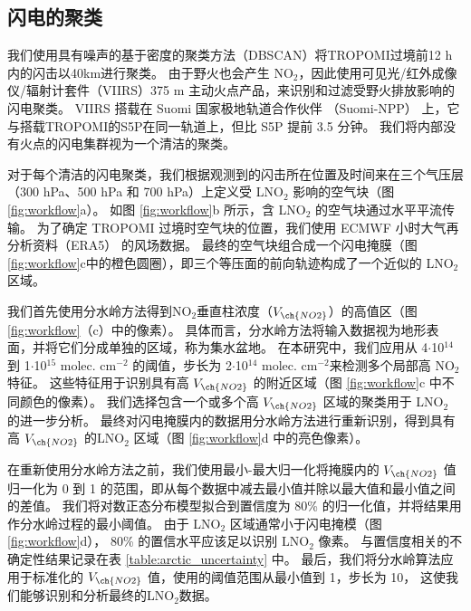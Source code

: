\subsection*{闪电的聚类}

我们使用具有噪声的基于密度的聚类方法（DBSCAN）将TROPOMI过境前12 h内\citep{Allen.2021a}的闪击以40km进行聚类\citep{backlund2011density,Schubert.2017}。
由于野火也会产生 NO$_2$，因此使用可见光/红外成像仪/辐射计套件（VIIRS）375 m 主动火点产品，来识别和过滤受野火排放影响的闪电聚类。
VIIRS 搭载在 Suomi 国家极地轨道合作伙伴 （Suomi-NPP） 上，它与搭载TROPOMI的S5P在同一轨道上，但比 S5P 提前 3.5 分钟。
我们将内部没有火点的闪电集群视为一个清洁的聚类。

对于每个清洁的闪电聚类，我们根据观测到的闪击所在位置及时间来在三个气压层（300 hPa、500 hPa 和 700 hPa）上定义受 LNO$_2$ 影响的空气块（图 \ref{fig:workflow}a）。
如图 \ref{fig:workflow}b 所示，含 LNO$_2$ 的空气块通过水平平流传输。
为了确定 TROPOMI 过境时空气块的位置，我们使用 ECMWF 小时大气再分析资料（ERA5） 的风场数据\citep{Hersbach.2020}。
最终的空气块组合成一个闪电掩膜（图 \ref{fig:workflow}c中的橙色圆圈），即三个等压面的前向轨迹构成了一个近似的 LNO$_2$ 区域。

我们首先使用分水岭方法得到NO$_2$垂直柱浓度（$V_{\ch{NO2}}$）的高值区（图 \ref{fig:workflow}（c）中的像素）。
具体而言，分水岭方法将输入数据视为地形表面，并将它们分成单独的区域，称为集水盆地\citep{Soille.1990,Heikenfeld.2019a}。
在本研究中，我们应用从 4$\cdot$10$^{14}$ 到 1$\cdot$10$^{15}$ molec. cm$^{-2}$ 的阈值，步长为 2$\cdot$10$^{14}$ molec. cm$^{-2}$来检测多个局部高 NO$_2$ 特征。
这些特征用于识别具有高 $V_{\ch{NO2}}$ 的附近区域（图 \ref{fig:workflow}c 中不同颜色的像素）。
我们选择包含一个或多个高 $V_{\ch{NO2}}$ 区域的聚类用于 LNO$_2$ 的进一步分析。
最终对闪电掩膜内的数据用分水岭方法进行重新识别，得到具有高 $V_{\ch{NO2}}$ 的LNO$_2$ 区域（图 \ref{fig:workflow}d 中的亮色像素）。

在重新使用分水岭方法之前，我们使用最小-最大归一化将掩膜内的 $V_{\ch{NO2}}$ 值归一化为 0 到 1 的范围，即从每个数据中减去最小值并除以最大值和最小值之间的差值。
我们将对数正态分布模型拟合到置信度为 80\% 的归一化值，并将结果用作分水岭过程的最小阈值。
由于 LNO$_2$ 区域通常小于闪电掩模（图 \ref{fig:workflow}d），
80\% 的置信水平应该足以识别 LNO$_2$ 像素。
与置信度相关的不确定性结果记录在表 \ref{table:arctic_uncertainty} 中。
最后，我们将分水岭算法应用于标准化的 $V_{\ch{NO2}}$ 值，使用的阈值范围从最小值到 1，步长为 10，
这使我们能够识别和分析最终的LNO$_2$数据。



